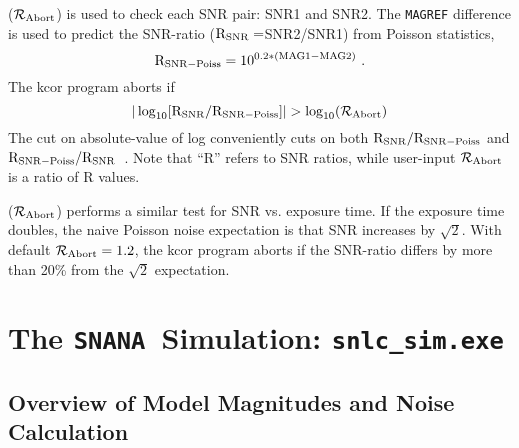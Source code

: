 \documentclass[12pt]{article}
\newcommand{\simexe}{{\tt snlc\_sim.exe}}
\newcommand{\snana}{{\tt SNANA}}
\begin{document}
{\bigskip

\newcommand{\Rpredict}{{\rm R}_{\rm SNR-Poiss}}  %
\newcommand{\RSNR}{{\rm R}_{\rm SNR}}           %
\newcommand{\RRabort}{{\cal R}_{\rm Abort}}    %

($\RRabort$) is used to check each SNR pair: SNR1 and SNR2. 
The {\tt MAGREF} difference is used to predict the
SNR-ratio ($\RSNR=$SNR2/SNR1) from Poisson statistics,
%
\begin{equation}
  \Rpredict = 10^{0.2*({\rm MAG1}-{\rm MAG2})} ~.
\end{equation}
%
The kcor program aborts if
\begin{equation}
  \vert \log_{10}[\RSNR/\Rpredict] \vert  > \log_{10}(\RRabort)
\end{equation}
%
The cut on absolute-value of log conveniently cuts on both
$\RSNR/\Rpredict$ and $\Rpredict/\RSNR$~.
Note that ``R'' refers to SNR ratios, while user-input 
$\RRabort$ is a ratio of R values.

\bigskip
{}
($\RRabort$)
performs a similar test for SNR vs. exposure time. 
If the exposure time doubles, the naive Poisson noise expectation
is that SNR increases by $\sqrt{2}$.
With default $\RRabort=1.2$, the kcor program aborts if
the SNR-ratio differs by more than 20\% from the
$\sqrt{2}$ expectation.

   \clearpage
   \section{The \snana\ Simulation:  \simexe}
   \label{sec:snlc_sim}

   \subsection{Overview of Model Magnitudes and Noise Calculation }
   \label{subsec:overview}

}
\end{document}
